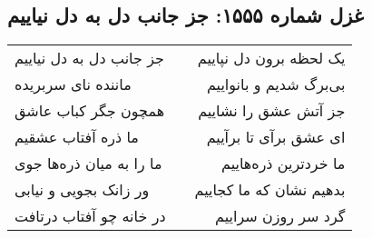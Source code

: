 \begin{center}
\section*{غزل شماره ۱۵۵۵: جز جانب دل به دل نیاییم}
\label{sec:1555}
\begin{longtable}{l p{0.5cm} r}
جز جانب دل به دل نیاییم
&&
یک لحظه برون دل نپاییم
\\
ماننده نای سربریده
&&
بی‌برگ شدیم و بانواییم
\\
همچون جگر کباب عاشق
&&
جز آتش عشق را نشاییم
\\
ما ذره آفتاب عشقیم
&&
ای عشق برآی تا برآییم
\\
ما را به میان ذره‌ها جوی
&&
ما خردترین ذره‌هاییم
\\
ور زانک بجویی و نیابی
&&
بدهیم نشان که ما کجاییم
\\
در خانه چو آفتاب درتافت
&&
گرد سر روزن سراییم
\\
\end{longtable}
\end{center}
